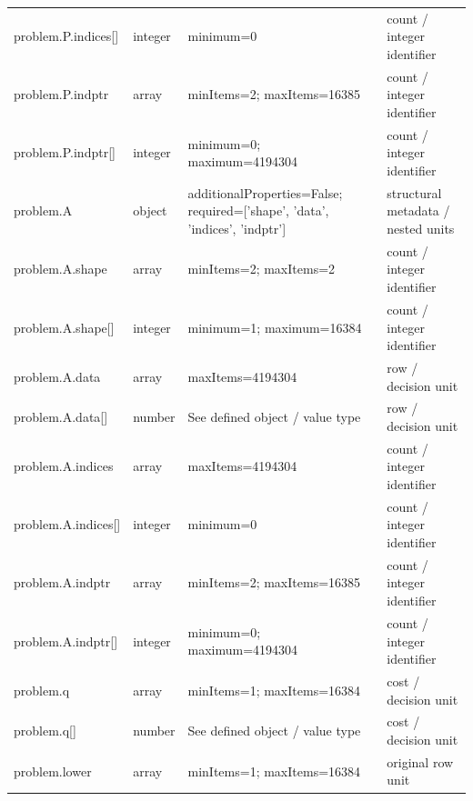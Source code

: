 \begin{longtable}{@{}>{\raggedright\arraybackslash}p{}>{\raggedright\arraybackslash}p{}>{\raggedright\arraybackslash}p{}>{\raggedright\arraybackslash}p{}@{}}
problem.\allowbreak{}P.\allowbreak{}indices[] & integer & minimum=\allowbreak{}0 & count /\allowbreak{} integer identifier\\
problem.\allowbreak{}P.\allowbreak{}indptr & array & minItems=\allowbreak{}2; maxItems=\allowbreak{}16385 & count /\allowbreak{} integer identifier\\
problem.\allowbreak{}P.\allowbreak{}indptr[] & integer & minimum=\allowbreak{}0; maximum=\allowbreak{}4194304 & count /\allowbreak{} integer identifier\\
problem.\allowbreak{}A & object & additionalProperties=\allowbreak{}False; required=\allowbreak{}['shape', 'data', 'indices', 'indptr'] & structural metadata /\allowbreak{} nested units\\
problem.\allowbreak{}A.\allowbreak{}shape & array & minItems=\allowbreak{}2; maxItems=\allowbreak{}2 & count /\allowbreak{} integer identifier\\
problem.\allowbreak{}A.\allowbreak{}shape[] & integer & minimum=\allowbreak{}1; maximum=\allowbreak{}16384 & count /\allowbreak{} integer identifier\\
problem.\allowbreak{}A.\allowbreak{}data & array & maxItems=\allowbreak{}4194304 & row /\allowbreak{} decision unit\\
problem.\allowbreak{}A.\allowbreak{}data[] & number & See defined object /\allowbreak{} value type & row /\allowbreak{} decision unit\\
problem.\allowbreak{}A.\allowbreak{}indices & array & maxItems=\allowbreak{}4194304 & count /\allowbreak{} integer identifier\\
problem.\allowbreak{}A.\allowbreak{}indices[] & integer & minimum=\allowbreak{}0 & count /\allowbreak{} integer identifier\\
problem.\allowbreak{}A.\allowbreak{}indptr & array & minItems=\allowbreak{}2; maxItems=\allowbreak{}16385 & count /\allowbreak{} integer identifier\\
problem.\allowbreak{}A.\allowbreak{}indptr[] & integer & minimum=\allowbreak{}0; maximum=\allowbreak{}4194304 & count /\allowbreak{} integer identifier\\
problem.\allowbreak{}q & array & minItems=\allowbreak{}1; maxItems=\allowbreak{}16384 & cost /\allowbreak{} decision unit\\
problem.\allowbreak{}q[] & number & See defined object /\allowbreak{} value type & cost /\allowbreak{} decision unit\\
problem.\allowbreak{}lower & array & minItems=\allowbreak{}1; maxItems=\allowbreak{}16384 & original row unit\\

\end{longtable}
